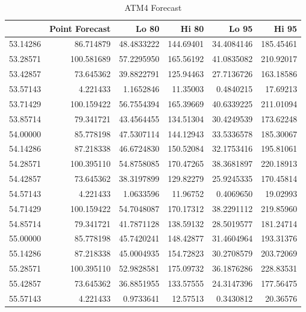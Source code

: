 \documentclass[openany]{book}
\begin{document}
\begin{table}[H]

\caption{\label{tab:unnamed-chunk-11}ATM4 Forecast}
\centering
\begin{tabular}{l|r|r|r|r|r}
\hline
\textbf{ } & \textbf{Point Forecast} & \textbf{Lo 80} & \textbf{Hi 80} & \textbf{Lo 95} & \textbf{Hi 95}\\
\hline
\rowcolor{gray!6}  53.14286 & 86.714879 & 48.4833222 & 144.69401 & 34.4084146 & 185.45461\\
\hline
53.28571 & 100.581689 & 57.2295950 & 165.56192 & 41.0835082 & 210.92017\\
\hline
\rowcolor{gray!6}  53.42857 & 73.645362 & 39.8822791 & 125.94463 & 27.7136726 & 163.18586\\
\hline
53.57143 & 4.221433 & 1.1652846 & 11.35003 & 0.4840215 & 17.69213\\
\hline
\rowcolor{gray!6}  53.71429 & 100.159422 & 56.7554394 & 165.39669 & 40.6339225 & 211.01094\\
\hline
53.85714 & 79.341721 & 43.4564455 & 134.51304 & 30.4249539 & 173.62248\\
\hline
\rowcolor{gray!6}  54.00000 & 85.778198 & 47.5307114 & 144.12943 & 33.5336578 & 185.30067\\
\hline
54.14286 & 87.218338 & 46.6724830 & 150.52084 & 32.1753416 & 195.81061\\
\hline
\rowcolor{gray!6}  54.28571 & 100.395110 & 54.8758085 & 170.47265 & 38.3681897 & 220.18913\\
\hline
54.42857 & 73.645362 & 38.3197899 & 129.82279 & 25.9245335 & 170.45814\\
\hline
\rowcolor{gray!6}  54.57143 & 4.221433 & 1.0633596 & 11.96752 & 0.4069650 & 19.02993\\
\hline
54.71429 & 100.159422 & 54.7048087 & 170.17312 & 38.2291112 & 219.85960\\
\hline
\rowcolor{gray!6}  54.85714 & 79.341721 & 41.7871128 & 138.59132 & 28.5019577 & 181.24714\\
\hline
55.00000 & 85.778198 & 45.7420241 & 148.42877 & 31.4604964 & 193.31376\\
\hline
\rowcolor{gray!6}  55.14286 & 87.218338 & 45.0004935 & 154.72823 & 30.2708579 & 203.72069\\
\hline
55.28571 & 100.395110 & 52.9828581 & 175.09732 & 36.1876286 & 228.83531\\
\hline
\rowcolor{gray!6}  55.42857 & 73.645362 & 36.8851955 & 133.57555 & 24.3147396 & 177.56475\\
\hline
55.57143 & 4.221433 & 0.9733641 & 12.57513 & 0.3430812 & 20.36576\\

\end{tabular}
\end{table}
\end{document}
